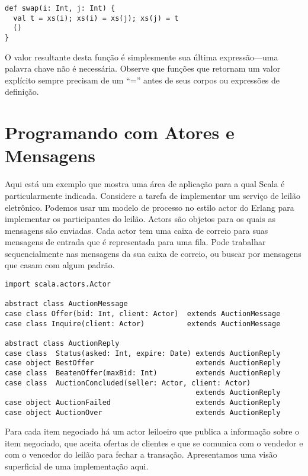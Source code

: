 \begin{lstlisting}
def swap(i: Int, j: Int) {
  val t = xs(i); xs(i) = xs(j); xs(j) = t
  ()
}
\end{lstlisting}

O valor resultante desta fun\c{c}\~{a}o \'{e} simplesmente sua \'{u}ltima express\~{a}o---uma
palavra chave \lstinline@return@ n\~{a}o \'{e} necess\'{a}ria. Observe que fun\c{c}\~{o}es 
que retornam um valor expl\'{i}cito sempre precisam de um ``='' antes de
seus corpos ou express\~{o}es de defini\c{c}\~{a}o.

\chapter{Programando com Atores e Mensagens}
\label{chap:example-auction}
Aqui est\'{a} um exemplo que mostra uma \'{a}rea de aplica\c{c}\~{a}o para a qual Scala 
\'{e} particularmente indicada. Considere a tarefa de implementar um servi\c{c}o
de leil\~{a}o eletr\^{o}nico. Podemos usar um modelo de processo no estilo 
actor do Erlang para implementar os participantes do leil\~{a}o. Actors s\~{a}o 
objetos para os quais as mensagens s\~{a}o enviadas. Cada actor tem uma caixa de correio 
para suas mensagens de entrada que \'{e} representada para uma fila. Pode
trabalhar sequencialmente nas mensagens da sua caixa de correio, ou buscar 
por mensagens que casam com algum padr\~{a}o. 

\begin{lstlisting}[style=floating,label=fig:simple-auction-msgs,caption=Message
    Classes for an Auction Service]
import scala.actors.Actor

abstract class AuctionMessage
case class Offer(bid: Int, client: Actor)  extends AuctionMessage
case class Inquire(client: Actor)          extends AuctionMessage

abstract class AuctionReply
case class  Status(asked: Int, expire: Date) extends AuctionReply
case object BestOffer                        extends AuctionReply
case class  BeatenOffer(maxBid: Int)         extends AuctionReply
case class  AuctionConcluded(seller: Actor, client: Actor) 
                                             extends AuctionReply
case object AuctionFailed                    extends AuctionReply
case object AuctionOver                      extends AuctionReply
\end{lstlisting}
Para cada item negociado h\'{a} um actor leiloeiro que publica a 
informa\c{c}\~{a}o sobre o item negociado, que aceita ofertas de clientes
e que se comunica com o vendedor e com o vencedor do leil\~{a}o 
para fechar a transa\c{c}\~{a}o. Apresentamos uma vis\~{a}o superficial de uma
 implementa\c{c}\~{a}o aqui.

